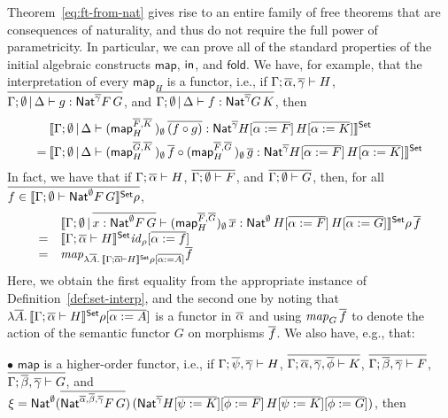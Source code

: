 \documentclass{lmcs}
\theoremstyle{plain}\newtheorem{satz}[thm]{Satz}
\newcommand{\fold}{\mathsf{fold}}
\renewcommand{\id}{\mathit{id}}
\newcommand{\map}{\mathsf{map}}
\begin{document}
{Theorem~\ref{eq:ft-from-nat} gives rise to an entire family of free
theorems that are consequences of naturality, and thus do not require
the full power of parametricity. In particular, we can prove all of
the standard properties of the initial algebraic constructs $\map$,
$\mathsf{in}$, and $\fold$. We have, for example, that the interpretation of
every $\map_H$ is a functor, i.e., if $\Gamma; \overline{\alpha}, \overline{\gamma}
\vdash H$, $\overline{\Gamma; \emptyset \,|\, \Delta \vdash g :
  \mathsf{Nat}^{\overline{\gamma}} F \, G}$, and $\overline{\Gamma; \emptyset \,|\, \Delta
  \vdash f : \mathsf{Nat}^{\overline{\gamma}} G \, K}$, then
  \begin{align*}
&\setsem{
\Gamma; \emptyset \,|\, \Delta \vdash 
  (\map^{\ol{F}, \ol{K}}_H \,)_{\emptyset} \, \ol{(f \circ g)}
  : \Nat^{\ol\gamma} H[\ol{\alpha := F}] \, H[\ol{\alpha := K}]} \\ 
= \hspace{0.03in} 
  &\setsem{
  \Gamma; \emptyset \,|\, \Delta \vdash 
  (\map^{\ol{G}, \ol{K}}_H \,)_{\emptyset} \, \ol{f} \circ 
  (\map^{\ol{F}, \ol{G}}_H \,)_{\emptyset} \, \ol{g}
  : \Nat^{\ol\gamma} H[\ol{\alpha := F}] \, H[\ol{\alpha := K}]}
\end{align*}
In fact, we have that if $\Gamma; \overline{\alpha} \vdash H$, $\overline{\Gamma;
  \emptyset \vdash F}$, and $\overline{\Gamma; \emptyset \vdash G}$, then,
for all $\overline{f \in \llbracket{\Gamma;\emptyset \vdash \mathsf{Nat}^\emptyset
    F\,G}\rrbracket^{\mathsf{Set}}\rho}$,
\[\begin{array}{rl}
&\setsem{ \Gamma;\emptyset\,|\,\ol{x : \Nat^\emptyset F \, G}
  \vdash (\map^{\ol{F},\ol{G}}_H)_\emptyset\,\ol x :
  \Nat^{\emptyset}\,H[\ol{\alpha := F}]\,H[\ol{\alpha := G}]}
\rho\,\ol f\\ =& \setsem{\Gamma; \ol{\alpha}\vdash H}
\id_{\rho}[\ol{\alpha := f}] \\ =&
\mathit{map}_{\lambda \ol{A}.\,\setsem{\Gamma; \ol{\alpha}\vdash H} \rho [\ol{\alpha := A}]} \ol{f} \\
\end{array}\]
Here, we obtain the first equality from the appropriate instance of
Definition~\ref{def:set-interp}, and the second one by noting that
$\lambda \overline{A}.\,\llbracket{\Gamma; \overline{\alpha}\vdash H}\rrbracket^{\mathsf{Set}} \rho
[\overline{\alpha := A}]$ is a functor in $\overline{\alpha}$ and using
$\mathit{map}_G\,\overline{f}$ to denote the action of the semantic functor
$G$ on morphisms $\overline{f}$. We also have, e.g., that:

\vspace*{0.1in}

\noindent
$\bullet$\; $\map$ is a higher-order functor, i.e., if $\Gamma;
\overline{\psi}, \overline{\gamma} \vdash H$,\; $\overline{\Gamma; \overline{\alpha},
  \overline{\gamma}, \overline{\phi} \vdash K}$,\; $\overline{\Gamma; \overline{\beta},
  \overline{\gamma} \vdash F}$,\; $\overline{\Gamma; \overline{\beta}, \overline{\gamma}
  \vdash G}$, and $\xi = \mathsf{Nat}^{\emptyset} (\overline{\mathsf{Nat}^{\overline{\alpha},
    \overline{\beta}, \overline{\gamma}} F\, G})\, (\mathsf{Nat}^{\overline{\gamma}} H[\overline{\psi
    := K}][\overline{\phi := F}]\, H[\overline{\psi := K}][\overline{\phi := G}])$, then

}
\end{document}
